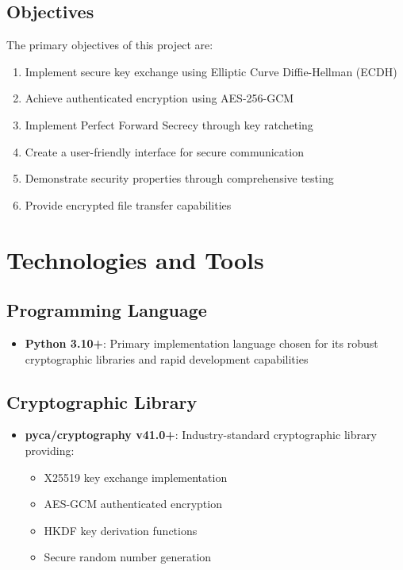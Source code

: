 \documentclass[12pt,a4paper]{article}
\begin{document}
\subsection{Objectives}

The primary objectives of this project are:

\begin{enumerate}
    \item Implement secure key exchange using Elliptic Curve Diffie-Hellman (ECDH)
    \item Achieve authenticated encryption using AES-256-GCM
    \item Implement Perfect Forward Secrecy through key ratcheting
    \item Create a user-friendly interface for secure communication
    \item Demonstrate security properties through comprehensive testing
    \item Provide encrypted file transfer capabilities
\end{enumerate}

\section{Technologies and Tools}

\subsection{Programming Language}
\begin{itemize}
    \item \textbf{Python 3.10+}: Primary implementation language chosen for its robust cryptographic libraries and rapid development capabilities
\end{itemize}

\subsection{Cryptographic Library}
\begin{itemize}
    \item \textbf{pyca/cryptography v41.0+}: Industry-standard cryptographic library providing:
    \begin{itemize}
        \item X25519 key exchange implementation
        \item AES-GCM authenticated encryption
        \item HKDF key derivation functions
        \item Secure random number generation
    \end{itemize}
\end{itemize}
\end{document}
